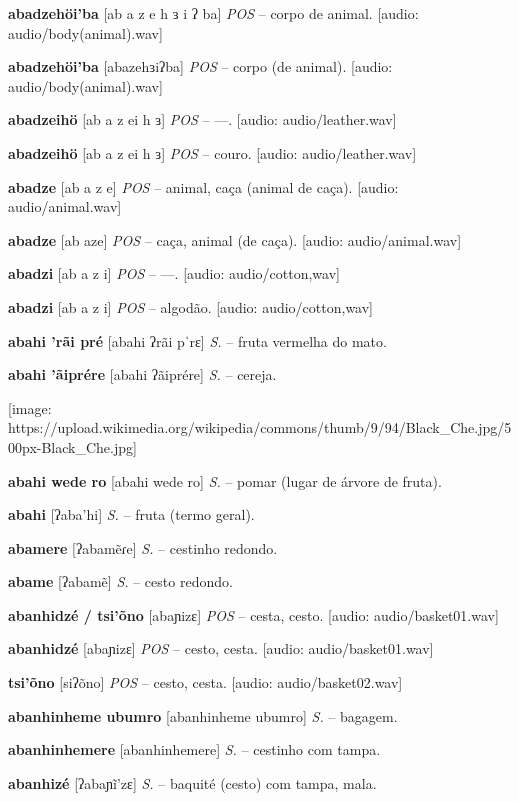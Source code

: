 {{\textbf{abadzehöi'ba} [ab a z e h ɜ i ʔ ba] \textit{POS} -- corpo de animal. [audio: audio/body(animal).wav]{\faHeadphones}

\textbf{abadzehöi'ba} [abazehɜiʔba] \textit{POS} -- corpo (de animal). [audio: audio/body(animal).wav]{\faHeadphones}

\textbf{abadzeihö} [ab a z ei h ɜ] \textit{POS} -- —. [audio: audio/leather.wav]{\faHeadphones}

\textbf{abadzeihö} [ab a z ei h ɜ] \textit{POS} -- couro. [audio: audio/leather.wav]{\faHeadphones}

\textbf{abadze} [ab a z e] \textit{POS} -- animal, caça (animal de caça). [audio: audio/animal.wav]{\faHeadphones}

\textbf{abadze} [ab aze] \textit{POS} -- caça, animal (de caça). [audio: audio/animal.wav]{\faHeadphones}

\textbf{abadzi} [ab a z i] \textit{POS} -- —. [audio: audio/cotton,wav]{\faHeadphones}

\textbf{abadzi} [ab a z i] \textit{POS} -- algodão. [audio: audio/cotton,wav]{\faHeadphones}

\textbf{abahi 'rãi pré} [abahi ʔrãi pˈrɛ] \textit{S.} -- fruta vermelha do mato.

\textbf{abahi 'ãiprére} [abahi ʔãiprére] \textit{S.} -- cereja.} [image: https://upload.wikimedia.org/wikipedia/commons/thumb/9/94/Black_Che.jpg/500px-Black_Che.jpg]

\textbf{abahi wede ro} [abahi wede ro] \textit{S.} -- pomar (lugar de árvore de fruta).

\textbf{abahi} [ʔaba'hi] \textit{S.} -- fruta (termo geral).

\textbf{abamere} [ʔabamẽɾe] \textit{S.} -- cestinho redondo.

\textbf{abame} [ʔabamẽ] \textit{S.} -- cesto redondo.

\textbf{abanhidzé / tsi'õno} [abaɲizɛ] \textit{POS} -- cesta, cesto. [audio: audio/basket01.wav]{\faHeadphones}

\textbf{abanhidzé} [abaɲizɛ] \textit{POS} -- cesto, cesta. [audio: audio/basket01.wav]{\faHeadphones}

\textbf{tsi'õno} [siʔõno] \textit{POS} -- cesto, cesta. [audio: audio/basket02.wav]{\faHeadphones}

\textbf{abanhinheme ubumro} [abanhinheme ubumro] \textit{S.} -- bagagem.

\textbf{abanhinhemere} [abanhinhemere] \textit{S.} -- cestinho com tampa.

\textbf{abanhizé} [ʔabaɲĩ'zɛ] \textit{S.} -- baquité (cesto) com tampa, mala.

}
